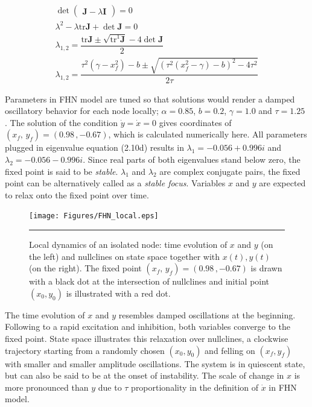 \begin{subequations}
\begin{align} \det \begin{pmatrix} \textbf{J} - \lambda \textbf{I} \end{pmatrix} = 0
              \label{eqn: frobenius 8}\\  
 \lambda^2 - \lambda \mathrm{tr} \textbf{J} + \det \textbf{J} = 0
               \label{eqn: frobenius 9} \\
\lambda_{1,2} = \dfrac{\mathrm{tr} \textbf{J} \pm \sqrt{\mathrm{tr} ^1 \textbf{J}} -4 \det \textbf{J} }{2}               
                \label{eqn: frobenius 10} \\    
\lambda_{1,2} = \dfrac{\tau^2(\gamma - x_f^2)-b \pm \sqrt{(\tau^2(x_f^2-\gamma)-b)^2 - 4 \tau^2 }}{2 \tau}
               \label{eqn: frobenius 11}                 
               \end{align} 
\end{subequations}

Parameters in FHN model are tuned so that solutions would render a damped oscillatory behavior for each node locally;  $\alpha = 0.85$, $b=0.2$, $\gamma=1.0$ and $\tau=1.25$ \citep{VUK13}. The solution of the condition $\dot{y}=\dot{x}=0$ gives coordinates of $(x_f, \, y_f) = (0.98 \, , -0.67 )$, which is calculated numerically here. All parameters plugged in eigenvalue equation (2.10d) results in $\lambda_1 = -0.056 + 0.996 i$ and $\lambda_2 = -0.056 - 0.996 i$. Since real parts of both eigenvalues stand below zero, the fixed point is said to be \textit{stable}. $\lambda_1$ and $\lambda_2$ are complex conjugate pairs, the fixed point can be alternatively called as a \textit{stable focus}. Variables $x$ and $y$ are expected to relax onto the fixed point over time.  

\begin{figure}[htbp]
  \centering
	\texttt{[image: Figures/FHN\_local.eps]}
 
    \rule{35em}{0.5pt}
    \caption[FHN Local]{Local dynamics of an isolated node: time evolution of $x$ and  $y$ (on the left) and nullclines on state space together with $x(t),y(t)$ (on the right). The fixed point $(x_f, \, y_f) = (0.98 \, , -0.67 )$ is drawn with a black dot at the intersection of nullclines and initial point $(x_0, y_0)$ is illustrated with a red dot.  }
  \label{fig:FHN Local}	
\end{figure}

The time evolution of $x$ and $y$ resembles damped oscillations at the beginning. Following to a rapid excitation and inhibition, both variables converge to the fixed point. State space illustrates this relaxation over nullclines, a clockwise trajectory starting from a randomly chosen $(x_0, y_0)$ and felling on $(x_f, y_f)$ with smaller and smaller amplitude oscillations. The system is in quiescent state, but can also be said to be at the onset of instability. The scale of change in $x$  is more pronounced than $y$ due to $\tau$ proportionality in the definition of $\dot{x}$ in FHN model.  
 
